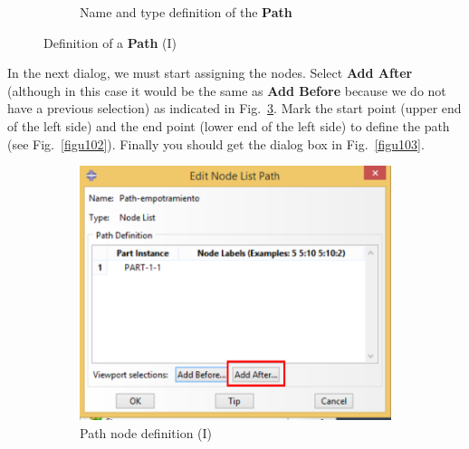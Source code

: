 \begin{enumerate}
\begin{figure}[H]
\begin{subfigure}{0.39\textwidth}
     \caption{Name and type definition of the \textbf{Path}}
     \label{figu100}
   \end{subfigure}%
   \caption{Definition of a \textbf{Path} (I)}
 \end{figure}

 In the next dialog, we must start assigning the nodes. Select
 \textbf{Add After} (although in this case it would be the same as
 \textbf {Add Before} because we do not have a previous selection) as
 indicated in Fig.~\ref{figu101}. Mark the start point (upper end of
 the left side) and the end point (lower end of the left side) to define the
 path (see Fig.~\ref{figu102}). Finally you should get the dialog box
 in Fig.~\ref{figu103}.

 \begin{figure}[H]
   \centering
   \begin{subfigure}{0.30\textwidth}
     \includegraphics[width=\textwidth]{./body/images/imagen101.pdf}
     \caption{Path node definition (I)}
     \label{figu101}
   \end{subfigure}%
   ~ %
   \begin{subfigure}{0.30\textwidth}

\end{subfigure}
\end{figure}
\end{enumerate}
